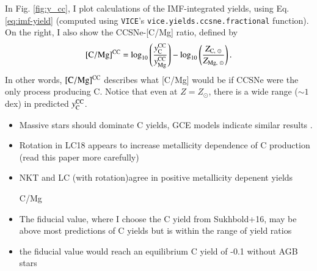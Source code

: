 \documentclass[12pt,oneside]{report}
\newcommand{\VICE}{\texttt{VICE}}
\newcommand{\Ycc}{\ensuremath{y_{\rm C}^{\rm CC}}}
\newcommand{\Yoc}{\ensuremath{y_{\rm Mg}^{\rm CC}}}
\newcommand{\sun}{\ensuremath{\odot}}
\begin{document}
In Fig. \ref{fig:y_cc}, I plot calculations of the IMF-integrated yields, using Eq. \ref{eq:imf-yield} (computed using \VICE's \texttt{vice.yields.ccsne.fractional} function). On the right, I also show the CCSNe-[C/Mg] ratio, defined by
\begin{equation}\label{eq:c_mg_cc}
    {\rm [C/Mg]^{CC}} = \log_{10}\left( \frac{\Ycc}{\Yoc}\right) - \log_{10} \left( \frac{Z_{{\rm C},\ \sun }}{Z_{{\rm Mg},\ \sun }} \right).
\end{equation}
In other words, ${\rm [C/Mg]^{CC}}$ describes what [C/Mg] would be if CCSNe were the only process producing C.
Notice that even at $Z=Z_\odot$, there is a wide range ($\sim 1$ dex) in predicted $\Ycc$. 

    \begin{itemize}
        \item Massive stars should dominate C yields, GCE models indicate similar results \citep[e.g.][]{prantzos+18,rybizki+17}.  
        \item Rotation in LC18 appears to increase metallicity dependence of C production (read this paper more carefully)
        \item NKT and LC (with rotation)agree in positive metallicity depenent yields
        \item [C/Mg]
        \item The fiducial value, where I choose the C yield from Sukhbold+16, may be above most predictions of C yields but is within the range of yield ratios
        \item the fiducial value would reach an equilibrium C yield of -0.1 without AGB stars
    \end{itemize}
    
\end{document}
